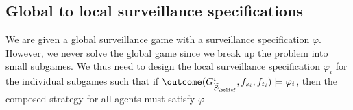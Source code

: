 \subsection{Global to local surveillance specifications}
We are given a global surveillance game with a surveillance specification $\varphi$. However, we never solve the global game since we break up the problem into small subgames. We thus need to design the local surveillance specification $\varphi_i$ for the individual subgames such that if $\outcome(G^{i}_{\widetilde{S}_\belief},f_{s_i},f_{t_i}) \models \varphi_i$, then the composed strategy for all agents must satisfy $\varphi$